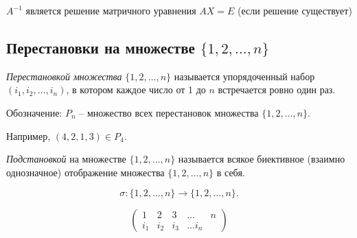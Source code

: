 \begin{corollary}
    $A^{-1}$ является решение матричного уравнения $AX = E$ (если решение существует)
\end{corollary}

\subsection{Перестановки на множестве $\{1, 2, \dots, n\}$}

\begin{definition}
    \textit{Перестановкой множества} $\{1, 2, \dots, n\}$ называется упорядоченный набор $(i_1, i_2, \dots, i_n)$, в котором каждое число от 1 до $n$ встречается ровно один раз. 
\end{definition}

Обозначение: $P_n$ -- множество всех перестановок множества $\{1, 2, \dots, n\}$.

Например, $(4, 2, 1, 3) \in P_4$.

\begin{definition}
    \textit{Подстановкой} на множестве $\{1, 2, \dots, n\}$ называется всякое биективное (взаимно однозначное) отображение множества $\{1, 2, \dots, n\}$ в себя.

    \begin{equation*}
        \sigma : \{1, 2, \dots, n\} \to \{1, 2, \dots, n\}
    .\end{equation*}

    \begin{equation*}
        \begin{pmatrix}
            1 & 2 & 3 & \dots & n \\
            i_1 & i_2 & i_3 & \dots i_n
        \end{pmatrix}
    \end{equation*}
\end{definition}

